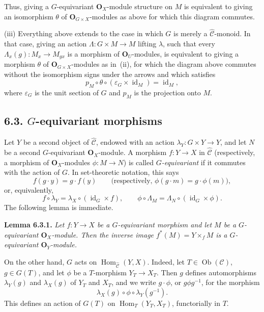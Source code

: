 Thus, giving a \(G\)-equivariant \(\mathbf O_X\)-module structure on
\(M\) is equivalent to giving an isomorphism \(\theta\) of
\(\mathbf O_{G\times X}\)-modules as above for which this diagram
commutes.

(iii) Everything above extends to the case in which \(G\) is merely a
\(\widehat{\mathscr C}\)-monoid. In that case, giving an action
\(\Lambda:G\times M\to M\) lifting \(\lambda\), such that every
\(\Lambda_x(g):M_x\to M_{gx}\) is a morphism of
\(\mathbf O_U\)-modules, is equivalent to giving a morphism \(\theta\)
of \(\mathbf O_{G\times X}\)-modules as in~(ii), for which the diagram
above commutes without the isomorphism signs under the arrows and which
satisfies
\[
  p_M\circ\theta\circ(\varepsilon_G\times\operatorname{id}_M)
  =\operatorname{id}_M,
\]
where \(\varepsilon_G\) is the unit section of \(G\) and \(p_M\) is the
projection onto \(M\).

\subsection*{6.3. \(G\)-equivariant morphisms}

Let \(Y\) be a second object of \(\widehat{\mathscr C}\), endowed with
an action \(\lambda_Y:G\times Y\to Y\), and let \(N\) be a second
\(G\)-equivariant \(\mathbf O_X\)-module. A morphism
\(f:Y\to X\) in \(\widehat{\mathscr C}\) (respectively, a morphism of
\(\mathbf O_X\)-modules \(\phi:M\to N\)) is called
\emph{\(G\)-equivariant} if it commutes with the action of \(G\). In
set-theoretic notation, this says
\[
  f(g\cdot y)=g\cdot f(y)
  \qquad
  \bigl(\text{respectively, }\phi(g\cdot m)=g\cdot\phi(m)\bigr),
\]
or, equivalently,
\[
  f\circ\lambda_Y=\lambda_X\circ(\operatorname{id}_G\times f),
  \qquad
  \phi\circ\Lambda_M=\Lambda_N\circ(\operatorname{id}_G\times\phi).
\]
The following lemma is immediate.

\medskip
\noindent\textbf{Lemma 6.3.1.}
\textit{Let \(f:Y\to X\) be a \(G\)-equivariant morphism and let \(M\)
be a \(G\)-equivariant \(\mathbf O_X\)-module. Then the inverse image
\(f^*(M)=Y\times_fM\) is a \(G\)-equivariant
\(\mathbf O_Y\)-module.}

On the other hand, \(G\) acts on
\(\operatorname{Hom}_{\widehat{\mathscr C}}(Y,X)\). Indeed, let
\(T\in\operatorname{Ob}(\mathscr C)\), \(g\in G(T)\), and let \(\phi\)
be a \(T\)-morphism \(Y_T\to X_T\). Then \(g\) defines automorphisms
\(\lambda_Y(g)\) and \(\lambda_X(g)\) of \(Y_T\) and \(X_T\), and we
write \(g\cdot\phi\), or \(g\phi g^{-1}\), for the morphism
\[
  \lambda_X(g)\circ\phi\circ\lambda_Y(g^{-1}).
\]
This defines an action of \(G(T)\) on
\(\operatorname{Hom}_T(Y_T,X_T)\), functorially in \(T\).

